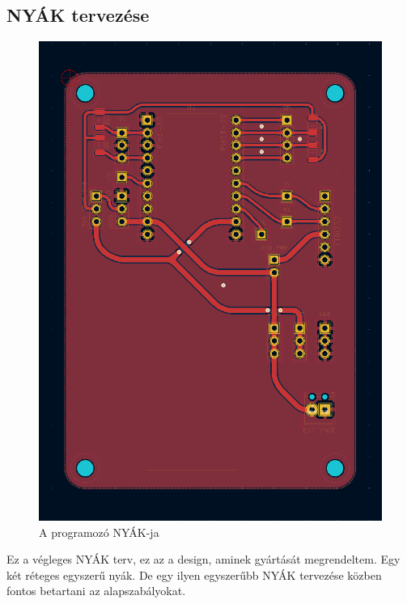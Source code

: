 \documentclass[a4paper,12pt,oneside]{book}
\begin{document}
\subsection{NYÁK tervezése}
\begin{figure}[H]
	\centering
	\includegraphics[trim=1mm 1mm 1mm 1mm,scale=0.45]{nyak.PNG}
	\caption{A programozó NYÁK-ja}
	\label{A programozó NYÁK-ja}
\end{figure}
Ez a végleges NYÁK terv, ez az a design, aminek gyártását megrendeltem. Egy két réteges egyszerű nyák. De egy ilyen egyszerűbb NYÁK tervezése közben fontos betartani az alapszabályokat.
\end{document}

